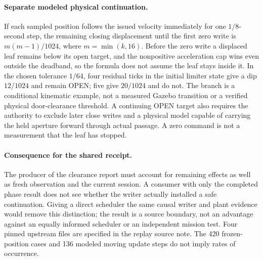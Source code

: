\documentclass{article}
\begin{document}
\paragraph{Separate modeled physical continuation.}
If each sampled position follows the issued velocity immediately
for one $1/8$-second step, the remaining closing displacement until
the first zero write is $m(m-1)/1024$, where $m=\min(k,16)$.
Before the zero write a displaced leaf remains below its open target,
and the nonpositive acceleration cap wins even outside the deadband,
so the formula does not assume the leaf stays inside it. In the
chosen tolerance $1/64$, four residual ticks in the initial limiter
state give a dip $12/1024$ and remain OPEN; five give $20/1024$
and do not. The branch is a conditional kinematic example, not a
measured Gazebo transition or a verified physical door-clearance
threshold. A continuing OPEN target also requires the authority to
exclude later close writes and a physical model capable of carrying
the held aperture forward through actual passage. A zero command is
not a measurement that the leaf has stopped.

\paragraph{Consequence for the shared receipt.}
The producer of the clearance report must account for remaining
effects as well as fresh observation and the current session.
A consumer with only the completed phase result does not see
whether the writer actually installed a safe continuation.
Giving a direct scheduler the same causal writer and plant evidence
would remove this distinction; the result is a source boundary,
not an advantage against an equally informed scheduler or an
independent mission test. Four pinned upstream files are specified
in the replay source note. The 420 frozen-position cases and 136
modeled moving update steps do not imply rates of occurrence.
\end{document}
